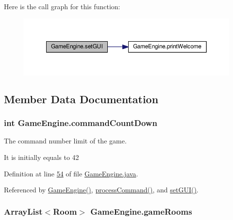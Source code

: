 Here is the call graph for this function\-:\nopagebreak
\begin{figure}[H]
\begin{center}
\leavevmode
\includegraphics[width=350pt]{classGameEngine_aec901a5b590b3cd204f196165da5dfb6_cgraph}
\end{center}
\end{figure}




\subsection{Member Data Documentation}
\hypertarget{classGameEngine_ad4ff8d760eced9c7b76cdeb0dc989975}{
\subsubsection[{command\-Count\-Down}]{\setlength{\rightskip}{0pt plus 5cm}int Game\-Engine.\-command\-Count\-Down\hspace{0.3cm}{\ttfamily [private]}}}\label{classGameEngine_ad4ff8d760eced9c7b76cdeb0dc989975}


The command number limit of the game. 

It is initially equals to 42 

Definition at line \hyperlink{GameEngine_8java_source_l00054}{54} of file \hyperlink{GameEngine_8java_source}{Game\-Engine.\-java}.



Referenced by \hyperlink{GameEngine_8java_source_l00059}{Game\-Engine()}, \hyperlink{GameEngine_8java_source_l00179}{process\-Command()}, and \hyperlink{GameEngine_8java_source_l00071}{set\-G\-U\-I()}.

\hypertarget{classGameEngine_ae5a2f252ec103e0630aebb8635341ea4}{
\subsubsection[{game\-Rooms}]{\setlength{\rightskip}{0pt plus 5cm}Array\-List$<${\bf Room}$>$ Game\-Engine.\-game\-Rooms\hspace{0.3cm}{\ttfamily [package]}}}\label{classGameEngine_ae5a2f252ec103e0630aebb8635341ea4}


